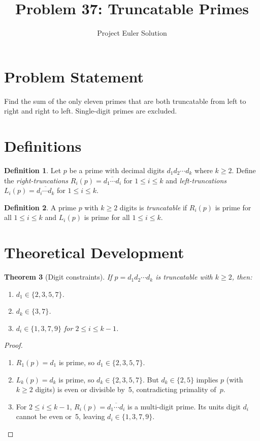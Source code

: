 \documentclass[12pt]{article}
\title{Problem 37: Truncatable Primes}
\author{Project Euler Solution}
\date{}
\newtheorem{theorem}{Theorem}
\theoremstyle{definition}
\newtheorem{definition}[theorem]{Definition}
\begin{document}
\maketitle

\section{Problem Statement}
Find the sum of the only eleven primes that are both truncatable from left to right and right to left. Single-digit primes are excluded.

\section{Definitions}

\begin{definition}
Let $p$ be a prime with decimal digits $d_1 d_2 \cdots d_k$ where $k \ge 2$. Define the \emph{right-truncations} $R_i(p) = \overline{d_1 \cdots d_i}$ for $1 \le i \le k$ and \emph{left-truncations} $L_i(p) = \overline{d_i \cdots d_k}$ for $1 \le i \le k$.
\end{definition}

\begin{definition}
A prime $p$ with $k \ge 2$ digits is \emph{truncatable} if $R_i(p)$ is prime for all $1 \le i \le k$ and $L_i(p)$ is prime for all $1 \le i \le k$.
\end{definition}

\section{Theoretical Development}

\begin{theorem}[Digit constraints]
\label{thm:digits}
If $p = d_1 d_2 \cdots d_k$ is truncatable with $k \ge 2$, then:
\begin{enumerate}
    \item $d_1 \in \{2, 3, 5, 7\}$.
    \item $d_k \in \{3, 7\}$.
    \item $d_i \in \{1, 3, 7, 9\}$ for $2 \le i \le k-1$.
\end{enumerate}
\end{theorem}
\begin{proof}
\begin{enumerate}
    \item $R_1(p) = d_1$ is prime, so $d_1 \in \{2,3,5,7\}$.
    \item $L_k(p) = d_k$ is prime, so $d_k \in \{2,3,5,7\}$. But $d_k \in \{2,5\}$ implies $p$ (with $k \ge 2$ digits) is even or divisible by~5, contradicting primality of~$p$.
    \item For $2 \le i \le k-1$, $R_i(p) = \overline{d_1 \cdots d_i}$ is a multi-digit prime. Its units digit $d_i$ cannot be even or~5, leaving $d_i \in \{1,3,7,9\}$. \qedhere
\end{enumerate}
\end{proof}
\end{document}
